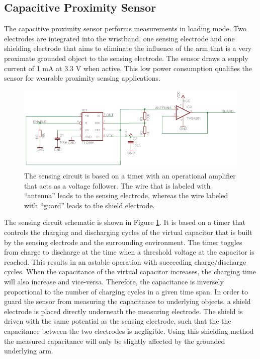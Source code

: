 \documentclass[runningheads,a4paper]{llncs}
\begin{document}
\subsection{Capacitive Proximity Sensor}

The capacitive proximity sensor performs measurements in loading mode. Two electrodes are integrated into the wristband, one sensing electrode and one shielding electrode that aims to eliminate the influence of the arm that is a very proximate grounded object to the sensing electrode. The sensor draws a supply current of 1 mA at 3.3 V when active. This low power consumption qualifies the sensor for wearable proximity sensing applications. 

\begin{figure}
	\centering
		\includegraphics[width=1.00\textwidth]{Images/schematic.pdf}
	\caption{The sensing circuit is based on a timer with an operational amplifier that acts as a voltage follower. The wire that is labeled with ``antenna'' leads to the sensing electrode, whereas the wire labeled with ``guard'' leads to the shield electrode.}
	\label{fig:schematic}
\end{figure}

The sensing circuit schematic is shown in Figure \ref{fig:schematic}. It is based on a timer that controls the charging and discharging cycles of the virtual capacitor that is built by the sensing electrode and the surrounding environment. The timer toggles from charge to discharge at the time when a threshold voltage at the capacitor is reached. This results in an astable operation with succeeding charge/discharge cycles. When the capacitance of the virtual capacitor increases, the charging time will also increase and vice-versa. Therefore, the capacitance is inversely proportional to the number of charging cycles in a given time span. In order to guard the sensor from measuring the capacitance to underlying objects, a shield electrode is placed directly underneath the measuring electrode. The shield is driven with the same potential as the sensing electrode, such that the the capacitance between the two electrodes is negligible. Using this shielding method the measured capacitance will only be slightly affected by the grounded underlying arm.
\end{document}
